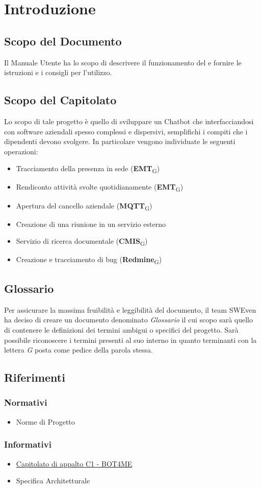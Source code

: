 \section{Introduzione}
\subsection{Scopo del Documento}
Il Manuale Utente ha lo scopo di descrivere il funzionamento del  e fornire le istruzioni e i consigli per l'utilizzo.

\subsection{Scopo del Capitolato}
Lo scopo di tale progetto è quello di sviluppare un Chatbot che interfacciandosi con software aziendali spesso complessi e dispersivi, semplifichi i compiti che i dipendenti devono svolgere. In particolare vengono individuate le seguenti operazioni: 
\begin{itemize}
	\item Tracciamento della presenza in sede (\textbf{EMT}\textsubscript{G})
	\item Rendiconto attività svolte quotidianamente (\textbf{EMT}\textsubscript{G})
	\item Apertura del cancello aziendale (\textbf{MQTT}\textsubscript{G})
	\item Creazione di una riunione in un servizio esterno
	\item Servizio di ricerca documentale (\textbf{CMIS}\textsubscript{G})
	\item Creazione e tracciamento di bug (\textbf{Redmine}\textsubscript{G})
\end{itemize}

\subsection{Glossario}
Per assicurare la massima fruibilità e leggibilità del documento, il team SWEven ha deciso di creare un documento denominato \textit{Glossario} il cui scopo sarà quello di contenere le definizioni dei termini ambigui o specifici del progetto. Sarà possibile riconoscere i termini presenti al suo interno in quanto terminanti con la lettera \textit{G} posta come pedice della parola stessa. 
\subsection{Riferimenti}
\subsubsection{Normativi}
\begin{itemize}
    \item Norme di Progetto \docVersionNdP
\end{itemize}
\subsubsection{Informativi}
\begin{itemize}
    \item \href{https://www.math.unipd.it/~tullio/IS-1/2021/Progetto/C1.pdf}{\color{blue} Capitolato di appalto C1 - BOT4ME}
    \item Specifica Architetturale \docVersionSA
\end{itemize}
\newpage